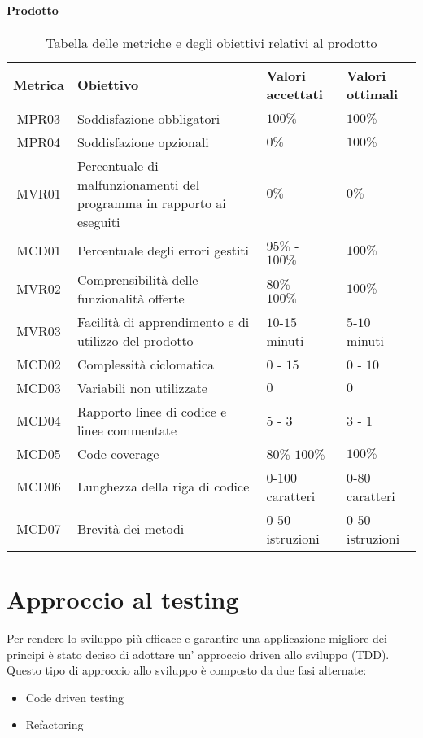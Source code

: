 \paragraph{Prodotto}
\begin{table}[H]
		\begin{center}
			\setlength{\aboverulesep}{0pt}
			\setlength{\belowrulesep}{0pt}
			\setlength{\extrarowheight}{.75ex}
			\begin{tabular}{ c C{6cm} C{3cm} C{3cm} }
				\textbf{Metrica} & \textbf{Obiettivo} & \textbf{Valori accettati} & \textbf{Valori ottimali}  \\
				\toprule
				MPR03 & Soddisfazione  obbligatori & $100 \%$ & $100 \%$ \\
				MPR04 & Soddisfazione  opzionali & $ 0 \%$ & $ 100\%$ \\
				MVR01 & Percentuale di malfunzionamenti del programma in rapporto ai  eseguiti & $ 0\%$  & $0\%$ \\
				MCD01 & Percentuale degli errori gestiti & $ 95\%$ - $100\% $ & $100\%$ \\
				MVR02 & Comprensibilità delle funzionalità offerte & $ 80\%$ - $100\% $ & $100\%$ \\
				MVR03 & Facilità di apprendimento e di utilizzo del prodotto & $10$-$15$ minuti & $5$-$10$ minuti \\
				MCD02 & Complessità ciclomatica & $0$ - $15$ & $0$ - $10$ \\
				MCD03 & Variabili non utilizzate & $0$ & $0$ \\
				MCD04 & Rapporto linee di codice e linee commentate & $5$ - $3$ & $3$ - $1$\\
				MCD05 & Code coverage & $80\%$-$100\%$ & $100\%$ \\
				MCD06 & Lunghezza della riga di codice & $0$-$100$ caratteri & $0$-$80$ caratteri \\
				MCD07 & Brevità dei metodi & $0$-$50$ istruzioni & $0$-$50$ istruzioni \\
				\bottomrule
			\end{tabular}
			\caption{Tabella delle metriche e degli obiettivi relativi al prodotto}
		\end{center}
	\end{table}

\section{Approccio al testing}
Per rendere lo sviluppo più efficace e garantire una applicazione migliore dei principi  è stato deciso di adottare un' approccio  driven allo sviluppo (TDD). \\
Questo tipo di approccio allo sviluppo è composto da due fasi alternate:
\begin{itemize}
\item Code driven testing
\item Refactoring
\end{itemize}
